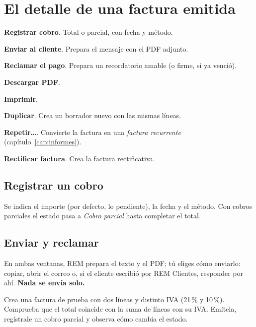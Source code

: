 \section{El detalle de una factura emitida}
\begin{leyenda}
\item[\mk{1}] \textbf{Registrar cobro}. Total o parcial, con fecha y método.
\item[\mk{2}] \textbf{Enviar al cliente}. Prepara el mensaje con el PDF adjunto.
\item[\mk{3}] \textbf{Reclamar el pago}. Prepara un recordatorio amable (o firme, si ya venció).
\item[\mk{4}] \textbf{Descargar PDF}.
\item[\mk{5}] \textbf{Imprimir}.
\item[\mk{6}] \textbf{Duplicar}. Crea un borrador nuevo con las mismas líneas.
\item[\mk{7}] \textbf{Repetir…}. Convierte la factura en una \emph{factura recurrente} (capítulo~\ref{cap:informes}).
\item[\mk{8}] \textbf{Rectificar factura}. Crea la factura rectificativa.
\end{leyenda}

\subsection{Registrar un cobro}
Se indica el importe (por defecto, lo pendiente), la fecha y el método. Con cobros parciales el estado pasa a \emph{Cobro parcial} hasta completar el total.

\subsection{Enviar y reclamar}
En ambas ventanas, REM prepara el texto y el PDF; tú eliges cómo enviarlo: copiar, abrir el correo o, si el cliente escribió por REM Clientes, responder por ahí. \textbf{Nada se envía solo.}

\begin{checkbox}
Crea una factura de prueba con dos líneas y distinto IVA (21\,\% y 10\,\%). Comprueba que el total coincide con la suma de líneas con su IVA. Emítela, regístrale un cobro parcial y observa cómo cambia el estado.
\end{checkbox}
